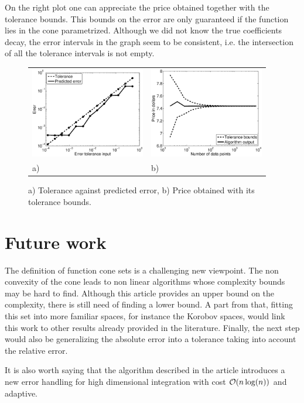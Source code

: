\documentclass[graybox]{svmult}
\begin{document}
On the right plot one can appreciate the price obtained together with the tolerance bounds. This bounds on the error are only guaranteed if the function lies in the cone parametrized. Although we did not know the true coefficients decay, the error intervals in the graph seem to be consistent, i.e. the intersection of all the tolerance intervals is not empty.
\begin{figure}[h!]
\centering
\begin{tabular}{>{\centering}p{5cm}>{\centering}p{5cm}}
\includegraphics[width=5cm]{Images/Multicall_conv.eps} &
\includegraphics[width=5cm]{Images/Multicall_error.eps}\tabularnewline
a) & b)
\end{tabular}
\caption{a) Tolerance against predicted error, b) Price obtained with its tolerance bounds. \label{BasketOption}}
\end{figure}

\section{Future work}
The definition of function cone sets is a challenging new viewpoint. The non convexity of the cone leads to non linear algorithms whose complexity bounds may be hard to find. Although this article provides an upper bound on the complexity, there is still need of finding a lower bound. A part from that, fitting this set into more familiar spaces, for instance the Korobov spaces, would link this work to other results already provided in the literature. Finally, the next step would also be generalizing the absolute error into a tolerance taking into account the relative error.

It is also worth saying that the algorithm described in the article introduces a new error handling for high dimensional integration with cost $\mathcal{O}(n\log(n))$ and adaptive.
\end{document}
